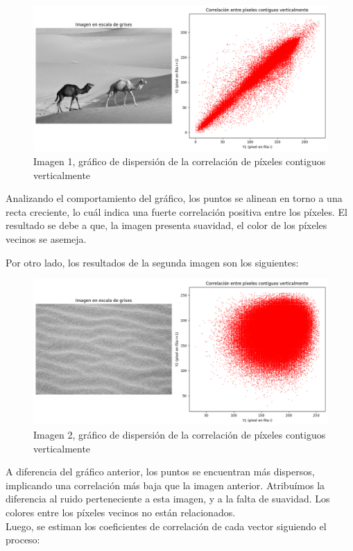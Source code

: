 \documentclass[a4paper,12pt]{article}
\numberwithin{equation}{section}
\numberwithin{figure}{section}
\begin{document}
\begin{figure}[H]
    \centering
    \includegraphics[width=1\textwidth]{Ejercicio1a.png}
    \caption{Imagen 1, gráfico de dispersión de la correlación de píxeles contiguos verticalmente}
    \label{fig:correlacion1}
\end{figure}

Analizando el comportamiento del gráfico, los puntos se alinean en torno a una recta creciente, lo cuál indica una fuerte correlación positiva entre los píxeles.
El resultado se debe a que, la imagen presenta suavidad, el color de los píxeles vecinos se asemeja.

Por otro lado, los resultados de la segunda imagen son los siguientes:

\begin{figure}[H]
    \centering
    \includegraphics[width=1\textwidth]{Ejercicio1b.png}
    \caption{Imagen 2, gráfico de dispersión de la correlación de píxeles contiguos verticalmente}
    \label{fig:correlacion2}
\end{figure}

A diferencia del gráfico anterior, los puntos se encuentran más dispersos, implicando una correlación más baja que la imagen anterior.
Atribuímos la diferencia al ruido perteneciente a esta imagen, y a la falta de suavidad. Los colores entre los píxeles vecinos no están relacionados.
\\
Luego, se estiman los coeficientes de correlación de cada vector siguiendo el proceso:
\end{document}
